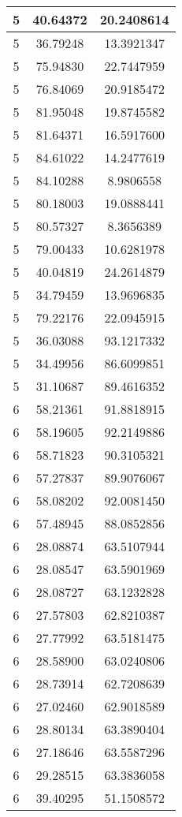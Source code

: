 \documentclass[
]{book}
\begin{document}
\begin{tabular}{c|c|c}
\hline
5 & 40.64372 & 20.2408614\\
\hline
5 & 36.79248 & 13.3921347\\
\hline
5 & 75.94830 & 22.7447959\\
\hline
5 & 76.84069 & 20.9185472\\
\hline
5 & 81.95048 & 19.8745582\\
\hline
5 & 81.64371 & 16.5917600\\
\hline
5 & 84.61022 & 14.2477619\\
\hline
5 & 84.10288 & 8.9806558\\
\hline
5 & 80.18003 & 19.0888441\\
\hline
5 & 80.57327 & 8.3656389\\
\hline
5 & 79.00433 & 10.6281978\\
\hline
5 & 40.04819 & 24.2614879\\
\hline
5 & 34.79459 & 13.9696835\\
\hline
5 & 79.22176 & 22.0945915\\
\hline
5 & 36.03088 & 93.1217332\\
\hline
5 & 34.49956 & 86.6099851\\
\hline
5 & 31.10687 & 89.4616352\\
\hline
6 & 58.21361 & 91.8818915\\
\hline
6 & 58.19605 & 92.2149886\\
\hline
6 & 58.71823 & 90.3105321\\
\hline
6 & 57.27837 & 89.9076067\\
\hline
6 & 58.08202 & 92.0081450\\
\hline
6 & 57.48945 & 88.0852856\\
\hline
6 & 28.08874 & 63.5107944\\
\hline
6 & 28.08547 & 63.5901969\\
\hline
6 & 28.08727 & 63.1232828\\
\hline
6 & 27.57803 & 62.8210387\\
\hline
6 & 27.77992 & 63.5181475\\
\hline
6 & 28.58900 & 63.0240806\\
\hline
6 & 28.73914 & 62.7208639\\
\hline
6 & 27.02460 & 62.9018589\\
\hline
6 & 28.80134 & 63.3890404\\
\hline
6 & 27.18646 & 63.5587296\\
\hline
6 & 29.28515 & 63.3836058\\
\hline
6 & 39.40295 & 51.1508572\\

\end{tabular}
\end{document}
